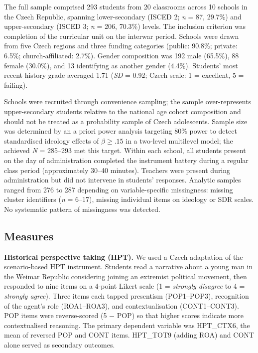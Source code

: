 \documentclass[referee,pdflatex,sn-apa]{sn-jnl}
\begin{document}
The full sample comprised 293 students from 20 classrooms across 10 schools in the Czech Republic, spanning lower-secondary (ISCED 2; \textit{n} = 87, 29.7\%) and upper-secondary (ISCED 3; \textit{n} = 206, 70.3\%) levels. The inclusion criterion was completion of the curricular unit on the interwar period. Schools were drawn from five Czech regions and three funding categories (public: 90.8\%; private: 6.5\%; church-affiliated: 2.7\%). Gender composition was 192 male (65.5\%), 88 female (30.0\%), and 13 identifying as another gender (4.4\%). Students' most recent history grade averaged 1.71 (\textit{SD} = 0.92; Czech scale: 1 = excellent, 5 = failing).

Schools were recruited through convenience sampling; the sample over-represents upper-secondary students relative to the national age cohort composition and should not be treated as a probability sample of Czech adolescents. Sample size was determined by an a priori power analysis targeting 80\% power to detect standardised ideology effects of $\beta \geq .15$ in a two-level multilevel model; the achieved \textit{N} = 285--293 met this target. Within each school, all students present on the day of administration completed the instrument battery during a regular class period (approximately 30--40 minutes). Teachers were present during administration but did not intervene in students' responses. Analytic samples ranged from 276 to 287 depending on variable-specific missingness: missing cluster identifiers (\textit{n} = 6--17), missing individual items on ideology or SDR scales. No systematic pattern of missingness was detected.

\subsection{Measures}\label{subsec:measures}

\textbf{Historical perspective taking (HPT).} We used a Czech adaptation of the \citet{Hartmann2008} scenario-based HPT instrument. Students read a narrative about a young man in the Weimar Republic considering joining an extremist political movement, then responded to nine items on a 4-point Likert scale (1 = \textit{strongly disagree} to 4 = \textit{strongly agree}). Three items each tapped presentism (POP1--POP3), recognition of the agent's role (ROA1--ROA3), and contextualisation (CONT1--CONT3). POP items were reverse-scored (5 $-$ POP) so that higher scores indicate more contextualised reasoning. The primary dependent variable was HPT\_CTX6, the mean of reversed POP and CONT items. HPT\_TOT9 (adding ROA) and CONT alone served as secondary outcomes.
\end{document}
